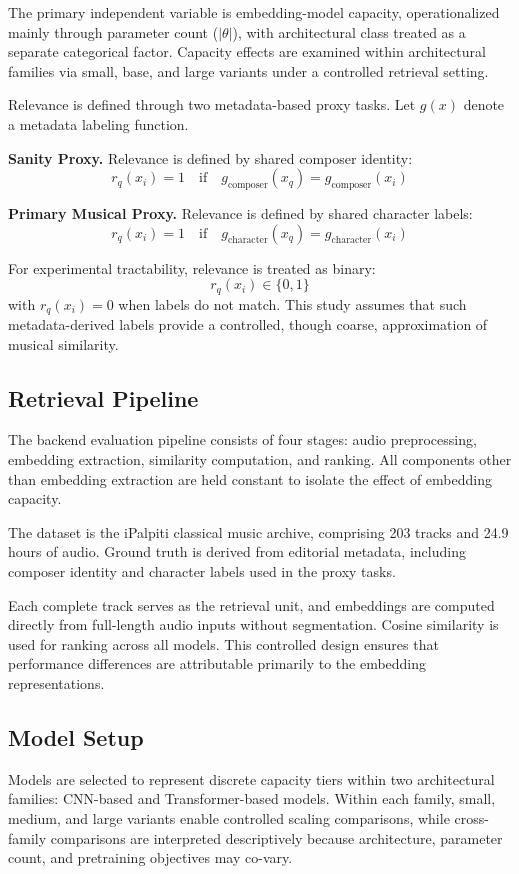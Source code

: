 \documentclass{article}
\begin{document}
The primary independent variable is embedding-model capacity, operationalized mainly through
parameter count ($|\theta|$), with architectural class treated as a separate categorical factor.
Capacity effects are examined within architectural families via small, base, and large variants under
a controlled retrieval setting.

Relevance is defined through two metadata-based proxy tasks. Let $g(x)$ denote a metadata labeling
function.

\textbf{Sanity Proxy.} Relevance is defined by shared composer identity:
\[
r_q(x_i) = 1 \quad \text{if} \quad g_{\text{composer}}(x_q) = g_{\text{composer}}(x_i)
\]

\textbf{Primary Musical Proxy.} Relevance is defined by shared character labels:
\[
r_q(x_i) = 1 \quad \text{if} \quad g_{\text{character}}(x_q) = g_{\text{character}}(x_i)
\]

For experimental tractability, relevance is treated as binary:
\[
r_q(x_i) \in \{0,1\}
\]
with $r_q(x_i)=0$ when labels do not match. This study assumes that such metadata-derived labels
provide a controlled, though coarse, approximation of musical similarity.

\subsection{Retrieval Pipeline}
The backend evaluation pipeline consists of four stages: audio preprocessing, embedding extraction,
similarity computation, and ranking. All components other than embedding extraction are held constant
to isolate the effect of embedding capacity.

The dataset is the iPalpiti classical music archive, comprising 203 tracks and 24.9 hours of
audio. Ground truth is derived from editorial metadata, including composer identity and character
labels used in the proxy tasks.

Each complete track serves as the retrieval unit, and embeddings are computed directly from
full-length audio inputs without segmentation. Cosine similarity is used for ranking across all
models. This controlled design ensures that performance differences are attributable primarily to
the embedding representations.

\subsection{Model Setup}
Models are selected to represent discrete capacity tiers within two architectural families: CNN-based
and Transformer-based models. Within each family, small, medium, and large variants enable controlled
scaling comparisons, while cross-family comparisons are interpreted descriptively because
architecture, parameter count, and pretraining objectives may co-vary.
\end{document}
